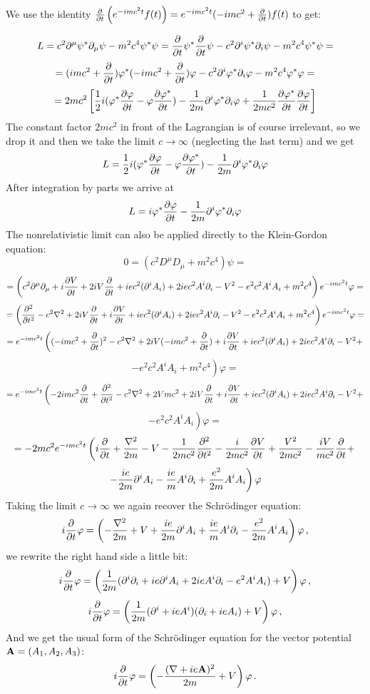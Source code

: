 We use the identity
${\partial\over\partial t}\left(e^{-imc^2t}f(t)\right)=
e^{-imc^2t}(-imc^2+{\partial\over\partial t})f(t)$ to get:

$$L=c^2\partial^\mu\psi^*\partial_\mu\psi-m^2c^4\psi^*\psi=
{\partial\over\partial t}\psi^*{\partial\over\partial t}\psi
-c^2\partial^i\psi^*\partial_i\psi-m^2c^4\psi^*\psi=$$
$$=(imc^2+{\partial\over\partial t})\varphi^*
(-imc^2+{\partial\over\partial t})\varphi
-c^2\partial^i\varphi^*\partial_i\varphi-m^2c^4\varphi^*\varphi=$$
$$=2mc^2\left[{1\over2}i(\varphi^*{\partial\varphi\over\partial t}-
\varphi{\partial\varphi^*\over\partial t})-
{1\over2m}\partial^i\varphi^*\partial_i\varphi
+{1\over2mc^2}{\partial\varphi^*\over\partial t}
{\partial\varphi\over\partial t}\right]$$
The constant factor $2mc^2$ in front of the Lagrangian is of course irrelevant,
so we drop it and then we take the limit $c\to\infty$ (neglecting the last
term) and we get
$$L={1\over2}i(\varphi^*{\partial\varphi\over\partial t}-
\varphi{\partial\varphi^*\over\partial t})-
{1\over2m}\partial^i\varphi^*\partial_i\varphi
$$
After integration by parts we arrive at
$$L=i\varphi^*{\partial\varphi\over\partial t}
-{1\over 2m}\partial^i\varphi^*\partial_i
\varphi$$
The nonrelativistic limit can also be applied directly to the Klein-Gordon equation:
$$0=(c^2D^\mu D_\mu+m^2c^4)\psi=$$
$$=\left(
c^2\partial^\mu\partial_\mu
+i{\partial V\over\partial t}
+2iV{\partial\over\partial t}
+iec^2(\partial^i A_i)
+2iec^2A^i\partial_i
-V^2
-e^2c^2A^iA_i
+m^2c^4
\right)e^{-imc^2t}\varphi=
$$
$$=\left(
{\partial^2\over\partial t^2}
-c^2\nabla^2
+2iV{\partial\over\partial t}
+i{\partial V\over\partial t}
+iec^2(\partial^i A_i)
+2iec^2A^i\partial_i
-V^2
-e^2c^2A^iA_i
+m^2c^4
\right)e^{-imc^2t}\varphi=
$$
$$=e^{-imc^2t}\left(
(-imc^2+{\partial\over\partial t})^2
-c^2\nabla^2
+2iV(-imc^2+{\partial\over\partial t})
+i{\partial V\over\partial t}
+iec^2(\partial^i A_i)
+2iec^2A^i\partial_i
-V^2+ \right.
$$
$$\left.
-e^2c^2A^iA_i
+m^2c^4
\right)\varphi=
$$
$$=e^{-imc^2t}\left(
-2imc^2{\partial\over\partial t}+{\partial^2\over\partial t^2}
-c^2\nabla^2
+2Vmc^2
+2iV{\partial\over\partial t}
+i{\partial V\over\partial t}
+iec^2(\partial^i A_i)
+2iec^2A^i\partial_i
-V^2+ \right.
$$
$$\left.
-e^2c^2A^iA_i
\right)\varphi=
$$
$$=
-2mc^2 e^{-imc^2 t} \left(i{\partial\over\partial t}+{\nabla^2\over2m}-V
-{1\over2mc^2}{\partial^2\over\partial t^2}-{i\over2mc^2}{\partial
V\over\partial t}+{V^2\over2mc^2}-{iV\over mc^2}{\partial\over\partial
t}+\right.$$
$$\left.-{ie\over2m}\partial^i A_i-{ie\over
m}A^i\partial_i+{e^2\over2m}A^iA_i\right)\varphi
$$
Taking the limit $c\to\infty$ we again recover the Schr\"odinger equation:
$$i{\partial\over\partial t}\varphi=\left(-{\nabla^2\over2
m}+V
+{ie\over2m}\partial^i A_i
+{ie\over m}A^i\partial_i
-{e^2\over2m}A^iA_i
\right)\varphi\,,$$
we rewrite the right hand side a little bit:
$$i{\partial\over\partial t}\varphi=\left({1\over2 m}
(\partial^i\partial_i
+ie\partial^i A_i
+2ieA^i\partial_i
-e^2A^iA_i
)
+V
\right)\varphi\,,$$
$$i{\partial\over\partial t}\varphi=\left({1\over2 m}
(\partial^i+ieA^i)(\partial_i+ieA_i)
+V
\right)\varphi\,,$$
And we get the usual form of the Schr\"odinger equation for the vector
potential ${\bf A}=(A_1, A_2, A_3)$:
$$i{\partial\over\partial t}\varphi=\left(-{(\nabla+ie{\bf A})^2\over2 m}
+V \right)\varphi\,.$$

